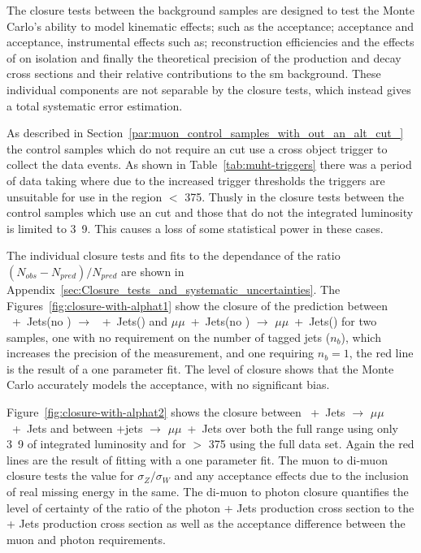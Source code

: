 The closure tests between the background samples are designed to test the 
Monte Carlo's ability to model kinematic effects; such as the \alt acceptance; 
\Pmu acceptance and \Pphoton acceptance, instrumental effects such as; 
reconstruction efficiencies and the effects of \pu on isolation and finally 
the theoretical precision of the production and decay cross sections and their 
relative contributions to the \ac{sm} background. These individual components 
are not separable by the closure tests, which instead gives a total systematic 
error estimation.

As described in Section~\ref{par:muon_control_samples_with_out_an_alt_cut_} the 
control samples which do not require an \alt cut use a \muht cross object 
trigger to collect the data events. As shown in Table~\ref{tab:muht-triggers} 
there was a period of data taking where due to the increased trigger thresholds 
the \muht triggers are unsuitable for use in the region \HT $<$ 
\unit{375}{\GeV}. Thusly in the closure tests between the control samples which 
use an \alt cut and those that do not the integrated luminosity is limited to 
\unit{3.9}{\invfb}. This causes a loss of some statistical power in these cases.

The individual closure tests and fits to the \HT dependance of the ratio 
$\left(N_{obs} - N_{pred}\right)/N_{pred}$ are shown in 
Appendix~\ref{sec:Closure_tests_and_systematic_uncertainties}.
The Figures~\ref{fig:closure-with-alphat1} show the closure of the prediction 
between \Pmu~+~Jets(no \alt) $\rightarrow$ \Pmu~+~Jets(\altg) and $\mu\mu$~+~Jets(no \alt) $\rightarrow$ 
$\mu\mu$~+~Jets(\altg) for two samples, one with no requirement on the number of \Pbottom 
tagged jets ($n_{b}$), which increases the precision of the measurement, and 
one requiring $n_{b} = 1$, the red line is the result of a one parameter fit. 
The level of closure shows that the Monte Carlo accurately models the \alt 
acceptance, with no significant bias.

Figure~\ref{fig:closure-with-alphat2} shows the closure between \Pmu~+~Jets 
$\rightarrow$ $\mu\mu$~+~Jets and between \Pphoton+jets $\rightarrow$ $\mu\mu$~+~Jets over both the 
full \HT range using only \unit{3.9}{\invfb} of integrated luminosity and for 
\HT $>$ \unit{375}{\GeV} using the full data set. Again the red lines are the 
result of fitting with a one parameter fit. The muon to di-muon closure tests the value for $\sigma_{Z}/\sigma_{W}$ and any acceptance effects due to the inclusion of real missing energy in the same. The di-muon to photon closure quantifies the level of certainty of the ratio of the photon + Jets production cross section to the \PZ + Jets production cross section as well as the acceptance difference between the muon and photon requirements.

